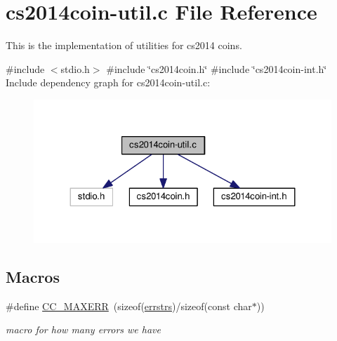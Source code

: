 \hypertarget{cs2014coin-util_8c}{}\section{cs2014coin-\/util.c File Reference}
\label{cs2014coin-util_8c}


This is the implementation of utilities for cs2014 coins.  


{\ttfamily \#include $<$stdio.\+h$>$}\newline
{\ttfamily \#include \char`\"{}cs2014coin.\+h\char`\"{}}\newline
{\ttfamily \#include \char`\"{}cs2014coin-\/int.\+h\char`\"{}}\newline
Include dependency graph for cs2014coin-\/util.c\+:\nopagebreak
\begin{figure}[H]
\begin{center}
\leavevmode
\includegraphics[width=324pt]{cs2014coin-util_8c__incl}
\end{center}
\end{figure}
\subsection*{Macros}
\begin{DoxyCompactItemize}
\item 
\mbox{\label{cs2014coin-util_8c_a83079f604f51143b0e11495d30d58b20}} 
\#define \hyperlink{cs2014coin-util_8c_a83079f604f51143b0e11495d30d58b20}{C\+C\+\_\+\+M\+A\+X\+E\+RR}~(sizeof(\hyperlink{cs2014coin-util_8c_a8e3da0eb987e1e7cd239012fe8d18655}{errstrs})/sizeof(const char$\ast$))
\begin{DoxyCompactList}\small\item\em macro for how many errors we have \end{DoxyCompactList}\end{DoxyCompactItemize}
